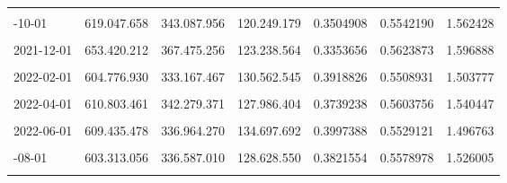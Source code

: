 \documentclass[12pt]{article}
\begin{document}
\begin{longtable}[t]{llllrrr}
\cellcolor{gray!10}{2021-09-01} & \cellcolor{gray!10}{629.638.197} & \cellcolor{gray!10}{353.060.999} & \cellcolor{gray!10}{127.099.137} & \cellcolor{gray!10}{0.3599920} & \cellcolor{gray!10}{0.5607363} & \cellcolor{gray!10}{1.559760}\\
\addlinespace
2021-10-01 & 619.047.658 & 343.087.956 & 120.249.179 & 0.3504908 & 0.5542190 & 1.562428\\
\cellcolor{gray!10}{2021-11-01} & \cellcolor{gray!10}{623.268.166} & \cellcolor{gray!10}{349.378.685} & \cellcolor{gray!10}{139.382.182} & \cellcolor{gray!10}{0.3989430} & \cellcolor{gray!10}{0.5605592} & \cellcolor{gray!10}{1.508132}\\
2021-12-01 & 653.420.212 & 367.475.256 & 123.238.564 & 0.3353656 & 0.5623873 & 1.596888\\
\cellcolor{gray!10}{2022-01-01} & \cellcolor{gray!10}{599.753.042} & \cellcolor{gray!10}{327.800.630} & \cellcolor{gray!10}{146.023.783} & \cellcolor{gray!10}{0.4454652} & \cellcolor{gray!10}{0.5465593} & \cellcolor{gray!10}{1.434898}\\
2022-02-01 & 604.776.930 & 333.167.467 & 130.562.545 & 0.3918826 & 0.5508931 & 1.503777\\
\addlinespace
\cellcolor{gray!10}{2022-03-01} & \cellcolor{gray!10}{602.964.529} & \cellcolor{gray!10}{335.803.641} & \cellcolor{gray!10}{118.736.455} & \cellcolor{gray!10}{0.3535889} & \cellcolor{gray!10}{0.5569211} & \cellcolor{gray!10}{1.562500}\\
2022-04-01 & 610.803.461 & 342.279.371 & 127.986.404 & 0.3739238 & 0.5603756 & 1.540447\\
\cellcolor{gray!10}{2022-05-01} & \cellcolor{gray!10}{602.960.596} & \cellcolor{gray!10}{331.986.501} & \cellcolor{gray!10}{127.216.648} & \cellcolor{gray!10}{0.3831983} & \cellcolor{gray!10}{0.5505940} & \cellcolor{gray!10}{1.514251}\\
2022-06-01 & 609.435.478 & 336.964.270 & 134.697.692 & 0.3997388 & 0.5529121 & 1.496763\\
\cellcolor{gray!10}{2022-07-01} & \cellcolor{gray!10}{603.734.003} & \cellcolor{gray!10}{333.751.521} & \cellcolor{gray!10}{119.615.528} & \cellcolor{gray!10}{0.3583970} & \cellcolor{gray!10}{0.5528122} & \cellcolor{gray!10}{1.549633}\\
\addlinespace
2022-08-01 & 603.313.056 & 336.587.010 & 128.628.550 & 0.3821554 & 0.5578978 & 1.526005\\
\cellcolor{gray!10}{2022-09-01} & \cellcolor{gray!10}{606.755.327} & \cellcolor{gray!10}{335.927.581} & \cellcolor{gray!10}{122.612.968} & \cellcolor{gray!10}{0.3649982} & \cellcolor{gray!10}{0.5536459} & \cellcolor{gray!10}{1.542177}\\

\end{longtable}
\end{document}
